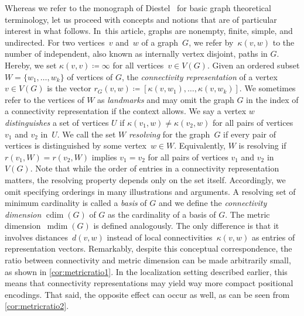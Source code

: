 \documentclass[letterpaper,12pt,headings=normal,parskip=half]{scrartcl}
\DeclareMathOperator{\cdim}{cdim}
\DeclareMathOperator{\mdim}{mdim}
\theoremstyle{definition}
\begin{document}
Whereas we refer to the monograph of Diestel~\cite{diestel2017graph} for basic graph theoretical terminology, let us proceed with concepts and notions that are of particular interest in what follows.
In~this article, graphs are nonempty, finite, simple, and undirected.
For two vertices~$v$ and~$w$ of a graph~$G$, we refer by~$\kappa(v,w)$ to the number of independent, also known as internally vertex disjoint, paths in $G$.
Hereby, we set ${{\kappa(v,v) \coloneqq \infty}}$ for all vertices~$v\in V(G)$. 
Given an ordered subset ${{W=\{w_1,\ldots,w_k\}}}$ of vertices of $G$, the \emph{connectivity representation} of a vertex ${{v\in V(G)}}$ is the vector ${{r_G(v,w)\coloneqq[\kappa(v,w_1),\ldots,\kappa(v,w_k)]}}$.
We sometimes refer to the vertices of $W$ as \emph{landmarks} and may omit the graph $G$ in the index of a connectivity representation if the context allows.
We say a vertex $w$ \emph{distinguishes} a set of vertices $U$ if $\kappa(v_1,w)\neq\kappa(v_2,w)$ for all pairs of vertices $v_1$ and $v_2$ in~$U$.
We call the set $W$ \emph{resolving} for the graph~$G$ if every pair of vertices is distinguished by some vertex~$w\in W$. Equivalently, $W$ is resolving if ${{r(v_1,W)=r(v_2,W)}}$ implies ${{v_1=v_2}}$ for all pairs of vertices $v_1$ and $v_2$ in~$V(G)$.
Note that while the order of entries in a connectivity representation matters, the resolving property depends only on the set itself.
Accordingly, we omit specifying orderings in many illustrations and arguments.
A resolving set of minimum cardinality is called a \emph{basis} of $G$ and we define the \emph{connectivity dimension} $\cdim(G)$ of $G$ as the cardinality of a basis of $G$. 
The metric dimension~$\mdim(G)$ is defined analogously. 
The only difference is that it involves distances~$d(v,w)$ instead of local connectivities~$\kappa(v,w)$ as entries of representation vectors.
Remarkably, despite this conceptual correspondence, the ratio between connectivity and metric dimension can be made arbitrarily small, as shown in \cref{cor:metricratio1}. In the localization setting described earlier, this means that connectivity representations may yield way more compact positional encodings. That said, the opposite effect can occur as well, as can be seen from \cref{cor:metricratio2}.
\end{document}
